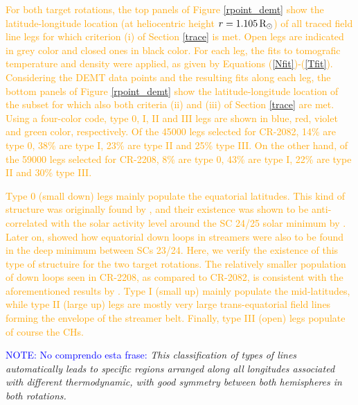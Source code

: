 \documentclass[namedreferences]{solarphysics}
\newcommand{\mrsun}{{\rm R_\odot}}
\def\albert#1{\textcolor{orange}{#1}}
\def\notebyalbert#1{\textcolor{blue}{NOTE: #1}}
\begin{document}
\begin{article}
\albert{For both target rotations, the top panels of Figure \ref{rpoint_demt} show the latitude-longitude location (at heliocentric height $r=1.105\,\mrsun$) of all traced field line legs for which criterion (i) of Section \ref{trace} is met. Open legs are indicated in grey color and closed ones in black color. For each leg, the fits to tomografic temperature and density were applied, as given by Equations (\ref{Nfit})-(\ref{Tfit}). Considering the DEMT data points and the resulting fits along each leg, the bottom panels of Figure \ref{rpoint_demt} show the latitude-longitude location of the subset for which also both criteria (ii) and (iii) of Section \ref{trace} are met. Using a four-color code, type 0, I, II and III legs are shown in blue, red, violet and green color, respectively.} \albert{Of the 45000 legs selected for CR-2082, 14\% are type 0, 38\% are type I, 23\% are type II and 25\% type III. On the other hand, of the 59000 legs selected for CR-2208, 8\% are type 0, 43\% are type I, 22\% are type II and 30\% type III.}

\albert{Type 0 (small down) legs mainly populate the equatorial latitudes. This kind of structure was originally found by \citet{huang_2012}, and their existence was shown to be anti-correlated with the solar activity level around the SC 24/25 solar minimum by \citet{nuevo_2013}. Later on, \citet{lloveras_2017} showed how equatorial down loops in streamers were also to be found in the deep minimum between SCs 23/24. Here, we verify the existence of this type of structuire for the two target rotations. The relatively smaller population of down loops seen in CR-2208, as compared to CR-2082, is consistent with the aforementioned results by \citet{nuevo_2013}. Type I (small up) mainly populate the mid-latitudes, while type II (large up) legs are mostly very large trans-equatorial field lines forming the envelope of the streamer belt. Finally, type III (open) legs populate of course the CHs.}

\notebyalbert{No comprendo esta frase:} \emph{This classification of types of lines automatically leads to specific regions arranged along all longitudes associated with different thermodynamic, with good symmetry between both hemispheres in both rotations.}


\end{article}
\end{document}
